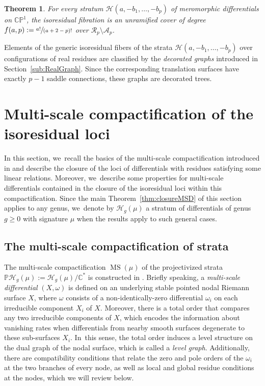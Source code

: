 \documentclass[JEP,XML,SOM,Unicode,NoFloatCountersInSection,published]{cedram}
\newcommand\PP{{\mathbb P}}
\DeclareMathOperator\MS{MS}
\newtheorem{thm}{Theorem}[section]
\theoremstyle{definition}
\begin{document}
\begin{thm}\label{thm:numerofibre}
For every stratum $\mathcal{H}(a,-b_{1},\dots,-b_{p})$ of meromorphic differentials on $\mathbb{CP}^{1}$, the isoresidual fibration is an unramified cover of degree $f(a,p):=\sfrac{a!}{(a+2-p)!}$ over $\mathcal{R}_{p} \setminus \mathcal{A}_{p}$.
\end{thm}

Elements of the generic isoresidual fibers of the strata $\mathcal{H}(a,-b_{1},\dots,-b_{p})$ over configurations of real residues are classified by the \textit{decorated graphs} introduced in Section~\ref{sub:RealGraph}. Since the corresponding translation surfaces have exactly $p-1$ saddle connections, these graphs are decorated trees.\enlargethispage{\baselineskip}

\section{Multi-scale compactification of the isoresidual loci}\label{sec:multi-scale}

In this section, we~recall the basics of the multi-scale compactification introduced in \cite{BCGGM3} and describe the closure of the loci of differentials with residues satisfying some linear relations. Moreover, we~describe some properties for multi-scale differentials contained in the closure of the isoresidual loci within this compactification. Since the main Theorem~\ref{thm:closureMSD} of this section applies to any genus, we~denote by $\mathcal H_{g}(\mu)$ a stratum of differentials of genus $g\geq0$ with signature $\mu$ when the results apply to such general cases.

\subsection{The multi-scale compactification of strata}\label{sub:multi-scale}

The multi-scale compactification $\MS(\mu)$ of the projectivized strata $\PP\mathcal H_{g}(\mu):= \mathcal H_{g}(\mu) / \mathbb C^*$ is constructed in \cite{BCGGM2}. Briefly speaking, a {\em multi-scale differential} $(X,\omega)$ is defined on an underlying stable pointed nodal Riemann surface $X$, where $\omega$ consists of a non-identically-zero differential $\omega_{i}$ on each irreducible component $X_{i}$ of $X$. Moreover, there is a total order that compares any two irreducible components of $X$, which encodes the information about vanishing rates when differentials from nearby smooth surfaces degenerate to these sub-surfaces $X_i$. In~this sense, the total order induces a level structure on the dual graph of the nodal surface, which is called a {\em level graph}. Additionally, there are compatibility conditions that relate the zero and pole orders of the $\omega_{i}$ at the two branches of every node, as well as local and global residue conditions at the nodes, which we will review below.
\end{document}
